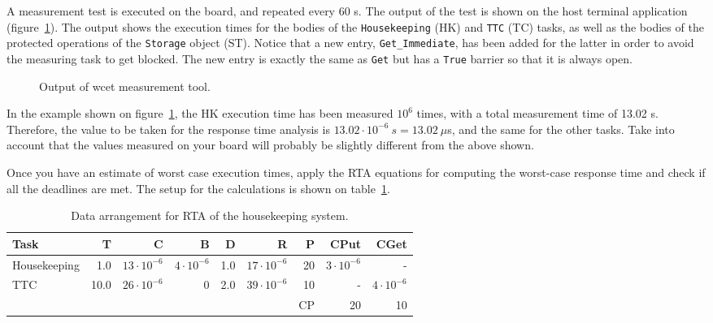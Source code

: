 A measurement test is executed on the board, and repeated every 60 s. The output of the test is shown on the host terminal application (figure~\ref{fig:wcet}). The output shows the execution times for the bodies of the {\tt Housekeeping} (HK) and {\tt TTC} (TC) tasks, as well as the bodies of the protected operations of the {\tt Storage} object (ST). Notice that a new entry, {\tt Get\_Immediate}, has been added for the latter in order to avoid the measuring task to get blocked. The new entry is exactly the same as {\tt Get} but has a {\tt True} barrier so that it is always open.

\begin{figure}[h]
            \caption{Output of wcet measurement tool.}
            \label{fig:wcet}
\end{figure}

In the example shown on figure~\ref{fig:wcet}, the HK execution time has been measured $10^{6}$ times, with a total measurement time of 13.02 s. Therefore, the value to be taken for the response time analysis is $13.02\cdot10^{-6}~s = 13.02~\mu${s}, and the same for the other tasks. Take into account that the values measured on your board will probably be slightly different from the above shown.

Once you have an estimate of worst case execution times, apply the RTA equations for computing the worst-case response time and check if all the deadlines are met. The setup for the calculations is shown on table~\ref{tb:wcet}.

\begin{table}[htb]
\begin{center}
\begin{tabular}{|l|r|r|r|r|r|r|r|r|} \hline
Task & T & C & B & D & R & P & CPut & CGet\\ \hline
Housekeeping & 1.0 & $13\cdot10^{-6}$ & $4\cdot10^{-6}$ & 1.0 & $17\cdot10^{-6}$& 20 & $3\cdot10^{-6}$ & - \\
TTC & 10.0 & $26\cdot10^{-6}$ & 0 & 2.0 & $39\cdot10^{-6}$ & 10 & - & $4\cdot10^{-6}$ \\ \hline
& & & & & & CP & 20 & 10 \\ \hline
\end{tabular}
\caption{Data arrangement for RTA of the housekeeping system.}
\label{tb:wcet}
\end{center}
\end{table}
